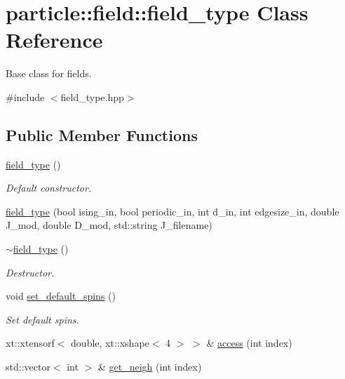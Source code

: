\hypertarget{classparticle_1_1field_1_1field__type}{}\section{particle\+:\+:field\+:\+:field\+\_\+type Class Reference}
\label{classparticle_1_1field_1_1field__type}


Base class for fields.  




{\ttfamily \#include $<$field\+\_\+type.\+hpp$>$}

\subsection*{Public Member Functions}
\begin{DoxyCompactItemize}
\item 
\hyperlink{classparticle_1_1field_1_1field__type_a23df5aab2db9bb195068513fdc8facab}{field\+\_\+type} ()
\begin{DoxyCompactList}\small\item\em Default constructor. \end{DoxyCompactList}\item 
\hyperlink{classparticle_1_1field_1_1field__type_a957e39bd01dddf793e324e07c8fd48b4}{field\+\_\+type} (bool ising\+\_\+in, bool periodic\+\_\+in, int d\+\_\+in, int edgesize\+\_\+in, double J\+\_\+mod, double D\+\_\+mod, std\+::string J\+\_\+filename)
\item 
\hyperlink{classparticle_1_1field_1_1field__type_abac5a921a73b94c132295ebc1840dc59}{$\sim$field\+\_\+type} ()
\begin{DoxyCompactList}\small\item\em Destructor. \end{DoxyCompactList}\item 
void \hyperlink{classparticle_1_1field_1_1field__type_a23d6de180f50944f53eb30febf7d0faf}{set\+\_\+default\+\_\+spins} ()
\begin{DoxyCompactList}\small\item\em Set default spins. \end{DoxyCompactList}\item 
xt\+::xtensorf$<$ double, xt\+::xshape$<$ 4 $>$ $>$ \& \hyperlink{classparticle_1_1field_1_1field__type_ab5c39381717c4d4b4e998edd94c99ecf}{access} (int index)
\item 
std\+::vector$<$ int $>$ \& \hyperlink{classparticle_1_1field_1_1field__type_adf78cfd03fcc91cc8d649c8ad10c28ea}{get\+\_\+neigh} (int index)

\end{DoxyCompactItemize}
